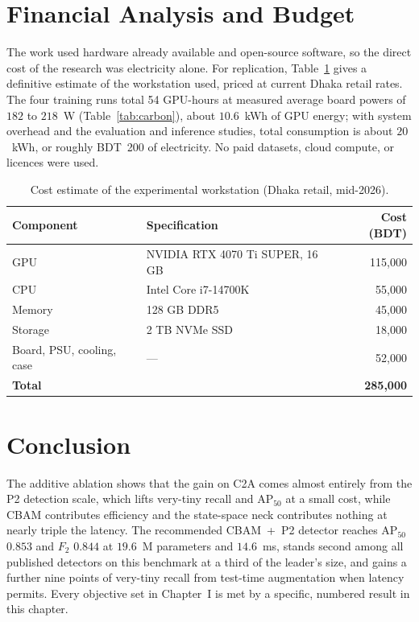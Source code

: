 \section{Financial Analysis and Budget}
\label{sec:budget}
The work used hardware already available and open-source software, so the
direct cost of the research was electricity alone. For replication,
Table~\ref{tab:budget} gives a definitive estimate of the workstation used,
priced at current Dhaka retail rates. The four training runs total 54
GPU-hours at measured average board powers of $182$ to $218$~W
(Table~\ref{tab:carbon}), about $10.6$~kWh of GPU energy; with system
overhead and the evaluation and inference studies, total consumption is
about $20$~kWh, or roughly BDT~200 of electricity. No paid datasets, cloud
compute, or licences were used.

\begin{table}[H]
  \centering
  \caption{Cost estimate of the experimental workstation (Dhaka retail, mid-2026).}
  \label{tab:budget}
  \begin{tabular}{@{}l l r@{}}
    \toprule
    Component & Specification & Cost (BDT) \\
    \midrule
    GPU & NVIDIA RTX 4070 Ti SUPER, 16 GB & 115{,}000 \\
    CPU & Intel Core i7-14700K & 55{,}000 \\
    Memory & 128 GB DDR5 & 45{,}000 \\
    Storage & 2 TB NVMe SSD & 18{,}000 \\
    Board, PSU, cooling, case & --- & 52{,}000 \\
    \midrule
    \textbf{Total} & & \textbf{285{,}000} \\
    \bottomrule
  \end{tabular}
\end{table}

\section{Conclusion}
The additive ablation shows that the gain on C2A comes almost entirely from
the P2 detection scale, which lifts very-tiny recall and $\mathrm{AP}_{50}$
at a small cost, while CBAM contributes efficiency and the state-space neck
contributes nothing at nearly triple the latency. The recommended CBAM~+~P2
detector reaches $\mathrm{AP}_{50}$ $0.853$ and $F_2$ $0.844$ at $19.6$~M
parameters and $14.6$~ms, stands second among all published detectors on this
benchmark at a third of the leader's size, and gains a further nine points of
very-tiny recall from test-time augmentation when latency permits. Every
objective set in Chapter~I is met by a specific, numbered result in this
chapter.
